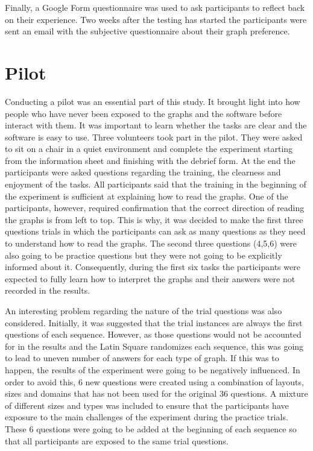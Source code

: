 \documentclass{l4proj}
\begin{document}
Finally, a Google Form questionnaire was used to ask participants to reflect back on their experience. Two weeks after the testing has started the participants were sent an email with the subjective questionnaire about their graph preference. 

\section{Pilot}

Conducting a pilot was an essential part of this study. It brought light into how people who have never been exposed to the graphs and the software before interact with them. It was important to learn whether the tasks are clear and the software is easy to use. Three volunteers took part in the pilot. They were asked to sit on a chair in a quiet environment and complete the experiment starting from the information sheet and finishing with the debrief form. At the end the participants were asked questions regarding the training, the clearness and enjoyment of the tasks. All participants said that the training in the beginning of the experiment is sufficient at explaining how to read the graphs. One of the participants, however, required confirmation that the correct direction of reading the graphs is from left to top. This is why, it was decided to make the first three questions trials in which the participants can ask as many questions as they need to understand how to read the graphs. The second three questions (4,5,6) were also going to be practice questions but they were not going to be explicitly informed about it. Consequently, during the first six tasks the participants were expected to fully learn how to interpret the graphs and their answers were not recorded in the results. 

An interesting problem regarding the nature of the trial questions was also considered. Initially, it was suggested that the trial instances are always the first questions of each sequence. However, as those questions would not be accounted for in the results and the Latin Square randomizes each sequence, this was going to lead to uneven number of answers for each type of graph. If this was to happen, the results of the experiment were going to be negatively influenced. In order to avoid this, 6 new questions were created using a combination of layouts, sizes and domains that has not been used for the original 36 questions. A mixture of different sizes and types was included to ensure that the participants have exposure to the main challenges of the experiment during the practice trials. These 6 questions were going to be added at the beginning of each sequence so that all participants are exposed to the same trial questions.  
\end{document}
